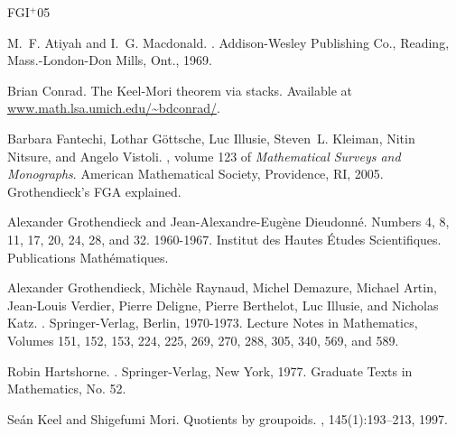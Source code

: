  \newpage
 \gdef\sectionname{References}
 \nocite{Atiyah-Macdonald,
         Conrad,
         EGA,
         FGAex,
         Hartshorne,
         Keel-Mori,
         Knutson,
         Lang:Algebra,
         Raynaud-Gruson,
         SGA,
         Vistoli}

%  
%  

 \newcommand{\etalchar}[1]{$^{#1}$}
 \begin{thebibliography}{FGI{\etalchar{+}}05}

M.~F. Atiyah and I.~G. Macdonald.
.
\newblock Addison-Wesley Publishing Co., Reading, Mass.-London-Don Mills, Ont.,
  1969.

Brian Conrad.
\newblock The Keel-Mori theorem via stacks.
\newblock Available at \url{www.math.lsa.umich.edu/~bdconrad/}.

 \bibitem[FGI{\etalchar{+}}05]{FGAex}
 Barbara Fantechi, Lothar G{\"o}ttsche, Luc Illusie, Steven~L. Kleiman, Nitin
   Nitsure, and Angelo Vistoli.
 , volume 123 of {\em Mathematical
   Surveys and Monographs}.
 \newblock American Mathematical Society, Providence, RI, 2005.
 \newblock Grothendieck's FGA explained.

 Alexander Grothendieck and Jean-Alexandre-Eug\`ene Dieudonn\'e.
 \newblock Numbers 4, 8, 11, 17, 20, 24, 28, and 32. 1960-1967.
 \newblock Institut des Hautes \'Etudes Scientifiques. Publications
   Math\'ematiques.

 Alexander Grothendieck, Mich\`ele Raynaud, Michel Demazure, Michael Artin,
   Jean-Louis Verdier, Pierre Deligne, Pierre Berthelot, Luc Illusie, and
   Nicholas Katz.
 .
 \newblock Springer-Verlag, Berlin, 1970-1973.
 \newblock Lecture Notes in Mathematics, Volumes 151, 152, 153, 224, 225, 269,
   270, 288, 305, 340, 569, and 589.

 Robin Hartshorne.
 .
 \newblock Springer-Verlag, New York, 1977.
 \newblock Graduate Texts in Mathematics, No. 52.

Se{\'a}n Keel and Shigefumi Mori.
\newblock Quotients by groupoids.
, 145(1):193--213, 1997.


\end{thebibliography}
